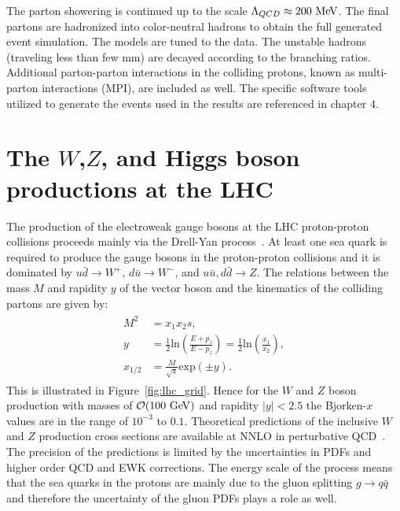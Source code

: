 The parton showering is continued up to the scale $\Lambda_{QCD} \approx 200~\mathrm{Me\kern -0.1em V}$. The final partons are hadronized into color-neutral hadrons to obtain the full generated event simulation. The models are tuned to the data. The unstable hadrons (traveling less than few mm) are decayed according to the branching ratios. Additional parton-parton interactions in the colliding protons, known as multi-parton interactions (MPI), are included as well. The specific software tools utilized to generate the events used in the results are referenced in chapter $4$.  

\section{The $W$,$Z$, and Higgs boson productions at the LHC}

The production of the electroweak gauge bosons at the LHC proton-proton collisions proceeds mainly via the Drell-Yan process~\cite{Drell:1970wh}. At least one sea quark is required to produce the gauge bosons in the proton-proton collisions and it is dominated by $u\bar{d} \rightarrow W^{+}$, $d\bar{u} \rightarrow W^{-}$, and $u\bar{u},d\bar{d} \rightarrow Z$. The relations between the mass $M$ and rapidity $y$ of the vector boson and the kinematics of the colliding partons are given by:
\begin{eqnarray} \label{eq:kinematics}
\begin{aligned}
M^2 &= x_{1}x_{2}s, \\
y &= \frac{1}{2} \mathrm{ln}\left(\frac{E+p_{z}}{E-p_{z}}\right) = \frac{1}{2}\mathrm{ln}\left(\frac{x_1}{x_2}\right), \\
x_{1/2} &= \frac{M}{\sqrt{s}} \mathrm{exp}(\pm y).
\end{aligned}
\end{eqnarray}   
This is illustrated in Figure~\ref{fig:lhc_grid}. Hence for the $W$ and $Z$ boson production with masses of $\mathcal{O} (100~\mathrm{Ge\kern -0.1em V})$ and rapidity $|y|<2.5$ the Bjorken-$x$ values are in the range of $10^{-3}$ to $0.1$. Theoretical predictions of the inclusive $W$ and $Z$ production cross sections are available at NNLO in perturbative QCD~\cite{Rijken:1994sh,Hamberg:1990np,vanNeerven:1991gh,Harlander:2002wh,PhysRevD.69.094008}. The precision of the predictions is limited by the uncertainties in PDFs and higher order QCD and EWK corrections. The energy scale of the process means that the sea quarks in the protons are mainly due to the gluon splitting $g \rightarrow q\bar{q}$ and therefore the uncertainty of the gluon PDFs plays a role as well.

